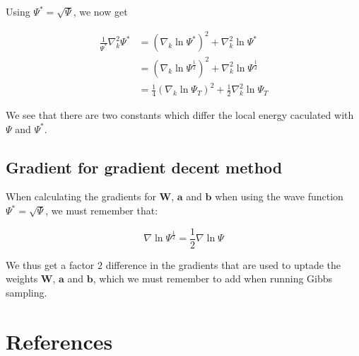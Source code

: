 \documentclass[norsk,a4paper,12pt]{article}
\begin{document}
Using $\Psi ^* = \sqrt{\Psi}$, we now get

\begin{align}
	\frac{1}{\Psi ^*}\nabla_k^2\Psi ^*
	&= (\nabla_k \ln \Psi ^*)^2 + \nabla_k^2 \ln \Psi ^* \\
	&= (\nabla_k \ln \Psi^{\frac{1}{2}})^2 + \nabla_k^2 \ln \Psi^{\frac{1}{2}} \\
	&= \frac{1}{4}(\nabla_k\ln\Psi_T)^2 + \frac{1}{2}\nabla_k^2\ln\Psi_T
\end{align}

We see that there are two constants which differ the local energy caculated with $\Psi$ and $\Psi ^*$. 

\subsection{Gradient for gradient decent method}
When calculating the gradients for $\boldsymbol{W}$, $\boldsymbol{a}$ and $\boldsymbol{b}$ when using the wave function $\Psi ^* = \sqrt{\Psi}$, we must remember that:

\begin{equation}
	\nabla \ln \Psi^{\frac{1}{2}} = \frac{1}{2} \nabla \ln \Psi
\end{equation}

We thus get a factor $2$ difference in the gradients that are used to uptade the weights $\boldsymbol{W}$, $\boldsymbol{a}$ and $\boldsymbol{b}$, which we must remember to add when running Gibbs sampling.


\newpage
\section{References}
\end{document}
